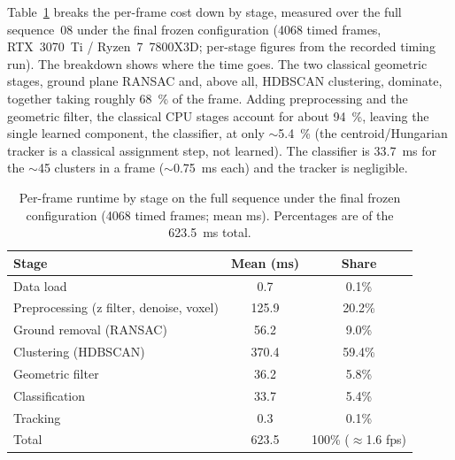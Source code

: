Table~\ref{tab:runtime} breaks the per-frame cost down by stage, measured over
the full sequence~08 under the final frozen configuration
(\num{4068} timed frames, RTX~3070~Ti / Ryzen~7~7800X3D;
per-stage figures from the recorded timing run). The breakdown shows where
the time goes. The two classical geometric stages, ground plane RANSAC and,
above all, HDBSCAN clustering, dominate, together taking roughly
\SI{68}{\percent} of the frame. Adding preprocessing and the geometric filter,
the classical CPU stages account for about \SI{94}{\percent}, leaving the single
learned component, the classifier, at only $\sim$\SI{5.4}{\percent} (the
centroid/Hungarian tracker is a classical assignment step, not learned). The
classifier is \SI{33.7}{\milli\second} for the $\sim$\num{45} clusters in a frame
($\sim$\SI{0.75}{\milli\second} each) and the tracker is negligible.

\begin{table}[H]
  \centering
  \caption[Per frame runtime by stage]{Per-frame runtime by stage on the full
    sequence under the final frozen configuration (\num{4068} timed frames; mean ms).
    Percentages are of the \SI{623.5}{\milli\second} total.}
  \label{tab:runtime}
  \begin{tabular}{lcc}
    \toprule
    Stage & Mean (ms) & Share \\
    \midrule
    Data load                       & 0.7   & 0.1\% \\
    Preprocessing (z filter, denoise, voxel) & 125.9 & 20.2\% \\
    Ground removal (RANSAC)         & 56.2  & 9.0\% \\
    Clustering (HDBSCAN)            & 370.4 & 59.4\% \\
    Geometric filter                & 36.2  & 5.8\% \\
    Classification                  & 33.7  & 5.4\% \\
    Tracking                        & 0.3   & 0.1\% \\
    \midrule
    Total                           & 623.5 & 100\% ($\approx$1.6 fps) \\
    \bottomrule
  \end{tabular}
\end{table}

